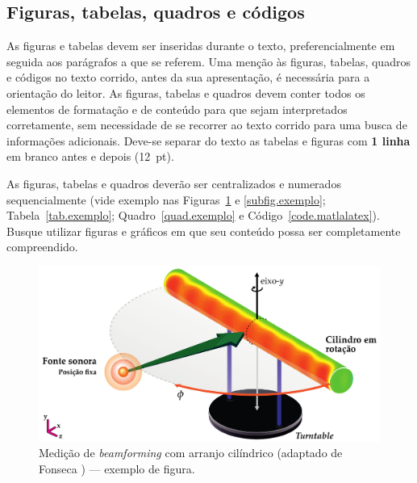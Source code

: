 \documentclass[12pt, a4paper, twoside, onecolumn]{article}
\begin{document}
\subsection{Figuras, tabelas, quadros e códigos}

As figuras e tabelas devem ser inseridas durante o texto, preferencialmente em seguida aos parágrafos a que se referem. Uma menção
às figuras, tabelas, quadros e códigos no texto corrido, antes da sua apresentação, é necessária para a orientação do leitor. As figuras, tabelas e quadros devem conter todos os elementos de formatação e de conteúdo para que sejam interpretados corretamente, sem necessidade de se recorrer ao texto corrido para uma busca de informações adicionais. Deve-se separar do texto as tabelas e figuras com \textbf{1 linha} em branco antes e depois (12~pt). 

\enlargethispage{1em}


As figuras, tabelas e quadros deverão ser centralizados e numerados sequencialmente (vide exemplo nas Figuras~\ref{fig:beamforming} e \ref{subfig.exemplo}; Tabela~\ref{tab.exemplo}; Quadro~\ref{quad.exemplo} e Código~\ref{code.matlalatex}). Busque utilizar figuras e gráficos em que seu conteúdo possa ser completamente compreendido. 

\begin{figure}[!ht] %
	\centering
	\includegraphics[width=0.72\linewidth]{figs/Measurement-Scheme-Fonseca-2013.pdf}%
	\caption{Medição de \textit{beamforming} com arranjo cilíndrico (adaptado de Fonseca \cite{Fonseca-2013}) --- exemplo de figura.}
	\label{fig:beamforming}%
\end{figure}
\end{document}
